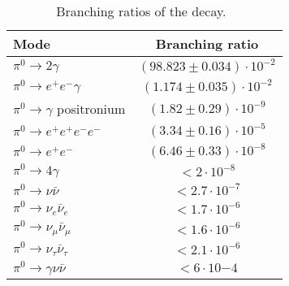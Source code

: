 \begin{table}
\begin{minipage}{\textwidth}
\begin{center}


\caption[Branching Ratios of the \piz Decay]{\label{tab:pi0} Branching ratios of the \pizT decay.~\cite{pdg2014}}
\begin{tabular}{l|c}
\hline												
Mode	& Branching ratio \\ \hline 	
$\pi^0 \to 2\gamma$	 &   $ (98.823 \pm 0.034)  \cdot 10^{-2}$ \\	
$\pi^0 \to e^+ e^-\gamma$  &  $  (1.174 \pm 0.035)  \cdot 10^{-2}$ \\
$\pi^0 \to \gamma $ positronium   &  $ (1.82 \pm 0.29)  \cdot 10^{-9}$\\
$\pi^0 \to  e^+ e^+ e^- e^-	$  &  $( 3.34 \pm 0.16)  \cdot 10^{-5}$\\
$\pi^0 \to  e^+ e^-$  &  $ (6.46 \pm 0.33)  \cdot  10^{-8}$\\
$\pi^0 \to 4\gamma$	&  $<2 \cdot 10^{-8}$\\
$\pi^0 \to \nu \bar \nu$  &  $<2.7 \cdot 10^{-7}$\\
$\pi^0 \to \nu_e \bar \nu_e$  &  $<1.7 \cdot 10^{-6}$\\
$\pi^0 \to \nu_{\mu} \bar \nu_{\mu}$  &  $<1.6 \cdot 10^{-6}$\\
$\pi^0 \to \nu_\tau \bar \nu_\tau $  &  $<2.1 \cdot 10^{-6}$\\
$\pi^0 \to \gamma \nu \bar \nu$	 &  $<6 \cdot 10{-4}$\\
\hline \hline%
\end{tabular}


\end{center}
\end{minipage}
\end{table}
\vspace{20pt}